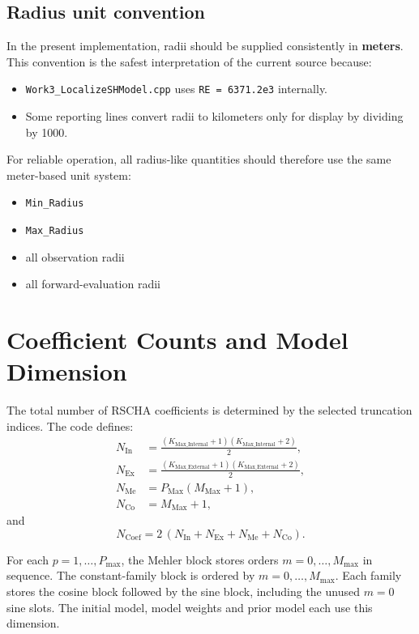 \documentclass[11pt,a4paper]{article}
\begin{document}
\subsection{Radius unit convention}

In the present implementation, radii should be supplied consistently in \textbf{meters}. This convention is the safest interpretation of the current source because:
\begin{itemize}
  \item \texttt{Work3\_LocalizeSHModel.cpp} uses \texttt{RE = 6371.2e3} internally.
  \item Some reporting lines convert radii to kilometers only for display by dividing by 1000.
\end{itemize}

For reliable operation, all radius-like quantities should therefore use the same meter-based unit system:
\begin{itemize}
  \item \texttt{Min\_Radius}
  \item \texttt{Max\_Radius}
  \item all observation radii
  \item all forward-evaluation radii
\end{itemize}

\section{Coefficient Counts and Model Dimension}

The total number of RSCHA coefficients is determined by the selected truncation indices. The code defines:
\begin{align*}
N_{\mathrm{In}} &= \frac{(K_{\mathrm{Max\_Internal}}+1)(K_{\mathrm{Max\_Internal}}+2)}{2},\\
N_{\mathrm{Ex}} &= \frac{(K_{\mathrm{Max\_External}}+1)(K_{\mathrm{Max\_External}}+2)}{2},\\
N_{\mathrm{Me}} &= P_{\mathrm{Max}}(M_{\mathrm{Max}}+1),\\
N_{\mathrm{Co}} &= M_{\mathrm{Max}} + 1,
\end{align*}
and
\[
N_{\mathrm{Coef}} = 2\,(N_{\mathrm{In}} + N_{\mathrm{Ex}} + N_{\mathrm{Me}} + N_{\mathrm{Co}}).
\]

For each $p=1,\ldots,P_{\max}$, the Mehler block stores orders
$m=0,\ldots,M_{\max}$ in sequence. The constant-family block is ordered
by $m=0,\ldots,M_{\max}$. Each family stores the cosine block followed
by the sine block, including the unused $m=0$ sine slots.
The initial model, model weights and prior model each use this dimension.
\end{document}
